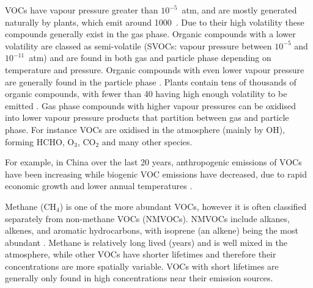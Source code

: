   
  VOCs have vapour pressure greater than $10^{-5}$~atm, and are mostly generated naturally by plants, which emit around 1000\tgpyr ~\parencite{Guenther1995, Glasius2016}.
  Due to their high volatility these compounds generally exist in the gas phase.
  Organic compounds with a lower volatility are classed as semi-volatile (SVOCs: vapour pressure between $10^{-5}$ and $10^{-11}$~atm) and are found in both gas and particle phase depending on temperature and pressure.
  Organic compounds with even lower vapour pressure are generally found in the particle phase \parencite{Glasius2016}.
  Plants contain tens of thousands of organic compounds, with fewer than 40 having high enough volatility to be emitted \parencite{Guenther2000}.
  Gas phase compounds with higher vapour pressures can be oxidised into lower vapour pressure products that partition between gas and particle phase. 
  For instance VOCs are oxidised in the atmosphere (mainly by OH), forming HCHO, O$_3$, CO$_2$ and many other species.
  
  For example, in China over the last 20 years, anthropogenic emissions of VOCs have been increasing while biogenic VOC emissions have decreased, due to rapid economic growth and lower annual temperatures \parencite{Stavrakou2014, Kwon2017}.
  
  Methane (CH$_4$) is one of the more abundant VOCs, however it is often classified separately from non-methane VOCs (NMVOCs).
  NMVOCs include alkanes, alkenes, and aromatic hydrocarbons, with isoprene (an alkene) being the most abundant \parencite{Guenther1995}.
  Methane is relatively long lived (years) and is well mixed in the atmosphere, while other VOCs have shorter lifetimes and therefore their concentrations are more spatially variable.
  VOCs with short lifetimes are generally only found in high concentrations near their emission sources.
  
